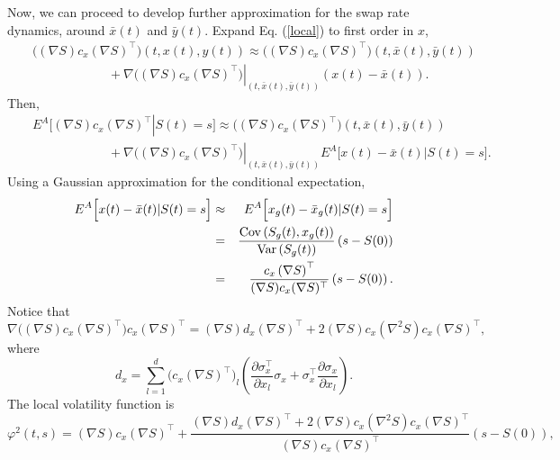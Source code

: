 \documentclass[12pt]{article}
\begin{document}
    Now, we can proceed to develop further approximation for the swap rate dynamics, around $\bar{x}(t)$ and $\bar{y}(t)$. Expand Eq. (\ref{local})
    to first order in $x$,
    \begin{eqnarray}
      &&\Big((\nabla S) c_x (\nabla S)^{\top}\Big)\left(t,x(t),y(t)\right)
        \approx \Big((\nabla S) c_x (\nabla S)^{\top}\Big)\left(t,\bar{x}(t),\bar{y}(t)\right)\nonumber\\
        &&\quad\quad\quad\quad\quad\quad +\left.\nabla\Big((\nabla S) c_x (\nabla S)^{\top}\Big)\right|_{\left(t,\bar{x}(t),\bar{y}(t)\right)}\left(x(t)-\bar{x}(t)\right).
    \end{eqnarray}
    Then,
    \begin{eqnarray}
      && E^A\bigg[\left.(\nabla S) c_x (\nabla S)^{\top}\right|S(t)=s\bigg]
          \approx \Big((\nabla S) c_x (\nabla S)^{\top}\Big)\left(t,\bar{x}(t),\bar{y}(t)\right)\nonumber\\
        &&\quad\quad\quad\quad\quad\quad +\left.\nabla\Big((\nabla S) c_x (\nabla S)^{\top}\Big)\right|_{\left(t,\bar{x}(t),\bar{y}(t)\right)}
              E^A\Big[x(t)-\bar{x}(t)|S(t)=s\Big].
    \end{eqnarray}
    Using a Gaussian approximation for the conditional expectation,
    \begin{eqnarray}
      E^A\Big[x(t)-\bar{x}(t)|S(t)=s\Big] &\approx& E^A\Big[x_g(t)-\bar{x}_g(t)|S(t)=s\Big]\nonumber\\
                &=& \frac{{\rm Cov}\left(S_g(t),x_g(t)\right)}{{\rm Var}\left(S_g(t)\right)}\left(s-S(0)\right)\nonumber\\
                &=& \frac{c_x\left(\nabla S\right)^{\top}}{(\nabla S) c_x (\nabla S)^{\top}}\left(s-S(0)\right).
    \end{eqnarray}
    Notice that
    \begin{equation}
      \nabla\Big((\nabla S) c_x (\nabla S)^{\top}\Big)c_x\left(\nabla S\right)^{\top}
        = (\nabla S) d_x (\nabla S)^{\top} + 2(\nabla S) c_x (\nabla^2 S) c_x (\nabla S)^{\top},
    \end{equation}
    where
    \begin{equation}
      d_x=\sum_{l=1}^d \Big(c_x (\nabla S)^{\top}\Big)_l
                \left(\frac{\partial \sigma_x^{\top}}{\partial x_l}\sigma_x+\sigma_x^{\top}\frac{\partial \sigma_x}{\partial x_l}\right).
    \end{equation}
    The local volatility function is
    \begin{equation}
      \varphi^2(t,s)=(\nabla S) c_x (\nabla S)^{\top}
          + \frac{(\nabla S) d_x (\nabla S)^{\top} + 2(\nabla S) c_x (\nabla^2 S) c_x (\nabla S)^{\top}}
                 {(\nabla S) c_x (\nabla S)^{\top}}\left(s-S(0)\right),
    \end{equation}
\end{document}
